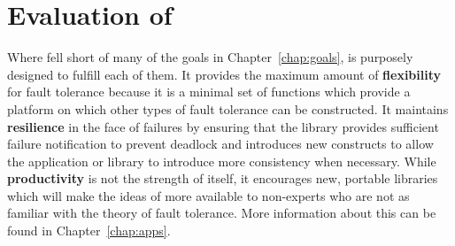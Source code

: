 \section{Evaluation of \ulfm}

Where \cof fell short of many of the goals in Chapter~\ref{chap:goals}, \ulfm is 
purposely designed to fulfill each of them. It provides the maximum amount of 
\textbf{flexibility} for fault tolerance because it is a minimal set of functions which 
provide a platform on which other types of fault tolerance can be constructed. It 
maintains \textbf{resilience} in the face of failures by ensuring that the library 
provides sufficient failure notification to prevent deadlock and introduces new 
constructs to allow the application or library to introduce more consistency when 
necessary. While \textbf{productivity} is not the strength of \ulfm itself, it 
encourages new, portable libraries which will make the ideas of \ulfm more available to 
non-experts who are not as familiar with the theory of fault tolerance. More 
information about this can be found in Chapter~\ref{chap:apps}.
